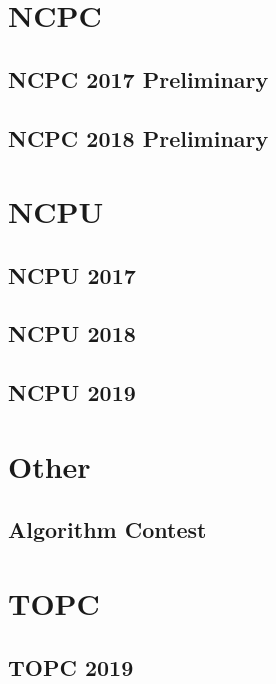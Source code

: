 \documentclass[a4paper]{report}
\begin{document}
\chapter{NCPC}
\section{NCPC 2017 Preliminary}

\section{NCPC 2018 Preliminary}


\chapter{NCPU}
\section{NCPU 2017}

\section{NCPU 2018}

\section{NCPU 2019}


\chapter{Other}
\section{Algorithm Contest}



\chapter{TOPC}
\section{TOPC 2019}


\end{document}
